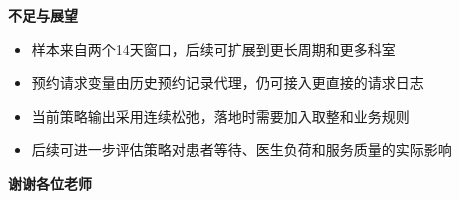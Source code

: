 \documentclass[aspectratio=169,UTF8,zihao=-4]{ctexbeamer}
\newcommand{\bigidea}[1]{
  \begin{center}
    \vspace{0.8em}
    {\LARGE \bfseries #1}
    \vspace{0.6em}
  \end{center}
}
\begin{document}
\begin{frame}
  \bigidea{不足与展望}
  \begin{itemize}
    \item \Large 样本来自两个14天窗口，后续可扩展到更长周期和更多科室
    \item \Large 预约请求变量由历史预约记录代理，仍可接入更直接的请求日志
    \item \Large 当前策略输出采用连续松弛，落地时需要加入取整和业务规则
    \item \Large 后续可进一步评估策略对患者等待、医生负荷和服务质量的实际影响
  \end{itemize}
\end{frame}

\begin{frame}[plain]
  \begin{center}
    \vfill
    {\Huge \bfseries 谢谢各位老师}

  \end{center}
\end{frame}
\end{document}

